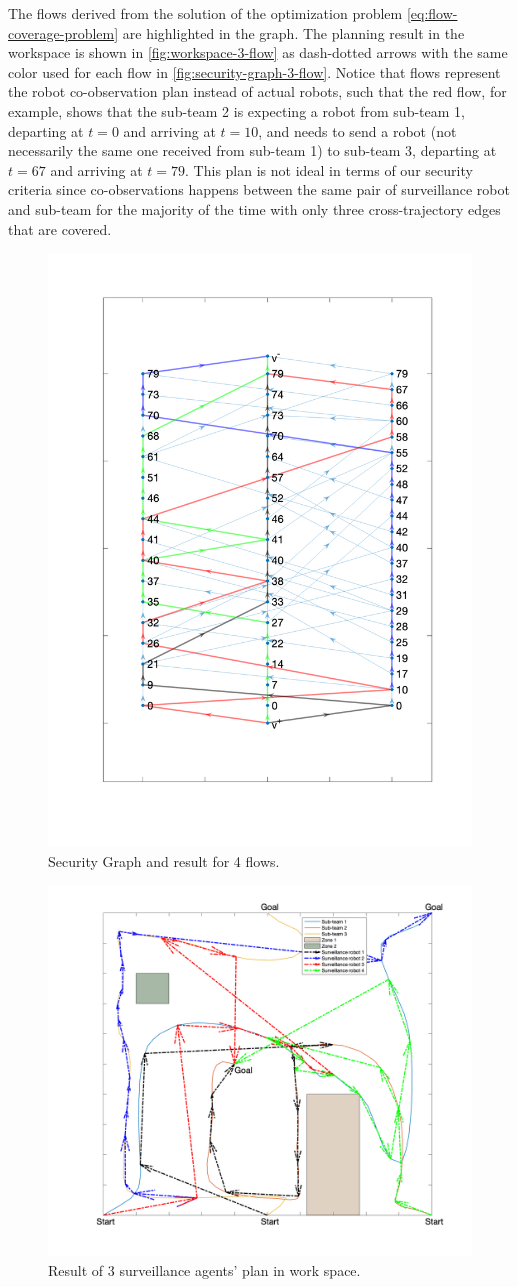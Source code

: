 \documentclass[journal]{IEEEtran}  %
\begin{document}
The flows derived from the solution of the optimization problem \eqref{eq:flow-coverage-problem} are highlighted in the graph. The planning result in the workspace is shown in \ref{fig:workspace-3-flow} as dash-dotted arrows with the same color used for each flow in \ref{fig:security-graph-3-flow}. Notice that flows represent the robot co-observation plan instead of actual robots, such that the red flow, for example, shows that the sub-team 2 is expecting a robot from sub-team 1, departing at $t=0$ and arriving at $t=10$, and needs to send a robot (not necessarily the same one received from sub-team 1) to sub-team 3, departing at $t=67$ and arriving at $t=79$. This plan is not ideal in terms of our security criteria since co-observations happens between the same pair of surveillance robot and sub-team for the majority of the time with only three cross-trajectory edges that are covered.

\begin{figure}[t]
\begin{center}
\includegraphics[width=0.4\linewidth]{graph_flow_result_4}
\caption{Security Graph and result for 4 flows.}
\label{fig:security-graph-4-flow}
\end{center}
\end{figure}

\begin{figure}[htbp]
\begin{center}
\includegraphics[width=0.6\linewidth]{4_flow_result}
\caption{Result of 3 surveillance agents' plan in work space.}
\label{fig:workspace-4-flow}
\end{center}
\end{figure}
\end{document}
